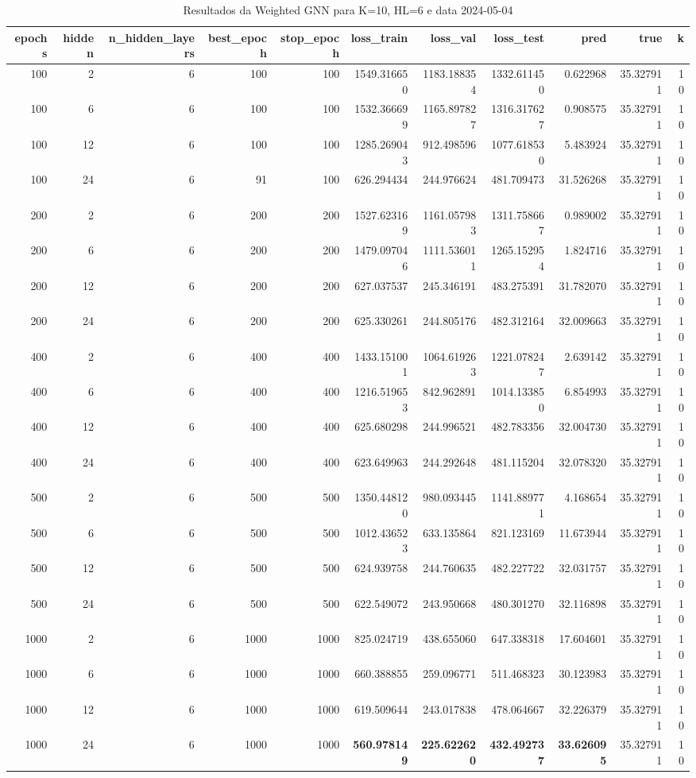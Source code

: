 \begin{table}
\caption{Resultados da Weighted GNN para K=10, HL=6 e data 2024-05-04}
\label{tab:weighted_gnn_results_k10_hl6_d20240504}
\begin{tabular}{rrrrrrrrrrr}
\toprule
epochs & hidden & n\_hidden\_layers & best\_epoch & stop\_epoch & loss\_train & loss\_val & loss\_test & pred & true & k \\
\midrule
100 & 2 & 6 & 100 & 100 & 1549.316650 & 1183.188354 & 1332.611450 & 0.622968 & 35.327911 & 10 \\
100 & 6 & 6 & 100 & 100 & 1532.366699 & 1165.897827 & 1316.317627 & 0.908575 & 35.327911 & 10 \\
100 & 12 & 6 & 100 & 100 & 1285.269043 & 912.498596 & 1077.618530 & 5.483924 & 35.327911 & 10 \\
100 & 24 & 6 & 91 & 100 & 626.294434 & 244.976624 & 481.709473 & 31.526268 & 35.327911 & 10 \\
200 & 2 & 6 & 200 & 200 & 1527.623169 & 1161.057983 & 1311.758667 & 0.989002 & 35.327911 & 10 \\
200 & 6 & 6 & 200 & 200 & 1479.097046 & 1111.536011 & 1265.152954 & 1.824716 & 35.327911 & 10 \\
200 & 12 & 6 & 200 & 200 & 627.037537 & 245.346191 & 483.275391 & 31.782070 & 35.327911 & 10 \\
200 & 24 & 6 & 200 & 200 & 625.330261 & 244.805176 & 482.312164 & 32.009663 & 35.327911 & 10 \\
400 & 2 & 6 & 400 & 400 & 1433.151001 & 1064.619263 & 1221.078247 & 2.639142 & 35.327911 & 10 \\
400 & 6 & 6 & 400 & 400 & 1216.519653 & 842.962891 & 1014.133850 & 6.854993 & 35.327911 & 10 \\
400 & 12 & 6 & 400 & 400 & 625.680298 & 244.996521 & 482.783356 & 32.004730 & 35.327911 & 10 \\
400 & 24 & 6 & 400 & 400 & 623.649963 & 244.292648 & 481.115204 & 32.078320 & 35.327911 & 10 \\
500 & 2 & 6 & 500 & 500 & 1350.448120 & 980.093445 & 1141.889771 & 4.168654 & 35.327911 & 10 \\
500 & 6 & 6 & 500 & 500 & 1012.436523 & 633.135864 & 821.123169 & 11.673944 & 35.327911 & 10 \\
500 & 12 & 6 & 500 & 500 & 624.939758 & 244.760635 & 482.227722 & 32.031757 & 35.327911 & 10 \\
500 & 24 & 6 & 500 & 500 & 622.549072 & 243.950668 & 480.301270 & 32.116898 & 35.327911 & 10 \\
1000 & 2 & 6 & 1000 & 1000 & 825.024719 & 438.655060 & 647.338318 & 17.604601 & 35.327911 & 10 \\
1000 & 6 & 6 & 1000 & 1000 & 660.388855 & 259.096771 & 511.468323 & 30.123983 & 35.327911 & 10 \\
1000 & 12 & 6 & 1000 & 1000 & 619.509644 & 243.017838 & 478.064667 & 32.226379 & 35.327911 & 10 \\
1000 & 24 & 6 & 1000 & 1000 & \textbf{560.978149} & \textbf{225.622620} & \textbf{432.492737} & \textbf{33.626095} & 35.327911 & 10 \\
\bottomrule
\end{tabular}
\end{table}


